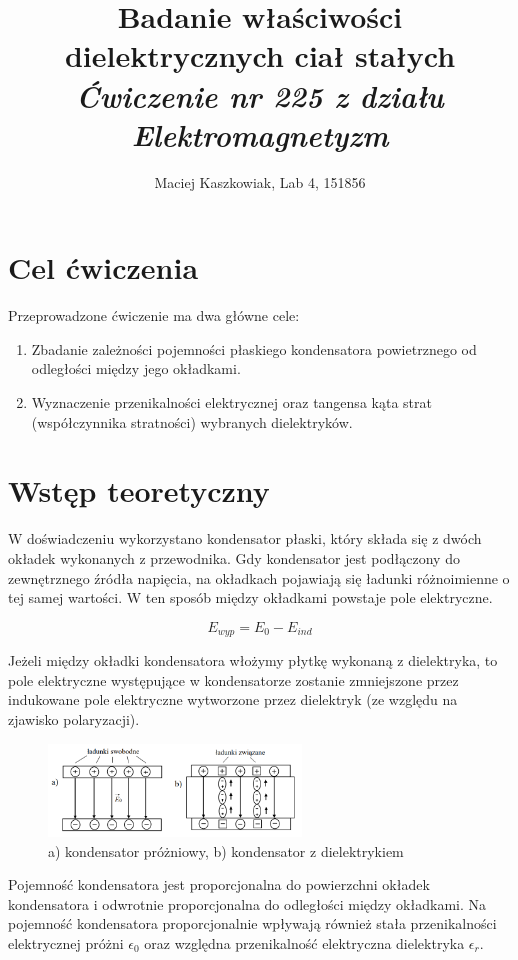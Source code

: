 \documentclass[polish, a4paper]{article}
\title{Badanie właściwości dielektrycznych ciał stałych\\
        \Large \emph{Ćwiczenie nr 225 z działu Elektromagnetyzm}}
\author{Maciej Kaszkowiak, Lab 4, 151856}
\date{\vspace{-5ex}} %
\begin{document}
\maketitle

\section{Cel ćwiczenia}
Przeprowadzone ćwiczenie ma dwa główne cele:
\begin{enumerate}
\item{Zbadanie zależności pojemności płaskiego kondensatora powietrznego od
odległości między jego okładkami.}
\item{Wyznaczenie przenikalności elektrycznej oraz tangensa kąta strat (współczynnika stratności) wybranych dielektryków.}
\end{enumerate}
\section{Wstęp teoretyczny}


W doświadczeniu wykorzystano kondensator płaski, który składa się z dwóch okładek wykonanych z przewodnika. Gdy kondensator jest podłączony do zewnętrznego źródła napięcia, na okładkach pojawiają się ładunki różnoimienne o tej samej wartości. W ten sposób między okładkami powstaje pole elektryczne.

\begin{equation}
E_{wyp} = E_0 - E_{ind}
\end{equation}

Jeżeli między okładki kondensatora włożymy płytkę wykonaną z dielektryka, to pole elektryczne występujące w kondensatorze zostanie zmniejszone przez indukowane pole elektryczne wytworzone przez dielektryk (ze względu na zjawisko polaryzacji).


\begin{figure}[H]
\centering
\includegraphics[width=0.6\textwidth]{kondensator.png}
\caption{a) kondensator próżniowy, b) kondensator z dielektrykiem}
\end{figure}

Pojemność kondensatora jest proporcjonalna do powierzchni okładek kondensatora i odwrotnie proporcjonalna do odległości między okładkami. Na pojemność kondensatora proporcjonalnie wpływają również stała przenikalności elektrycznej próżni $\epsilon_0$ oraz względna przenikalność elektryczna dielektryka $\epsilon_r$.
\end{document}
